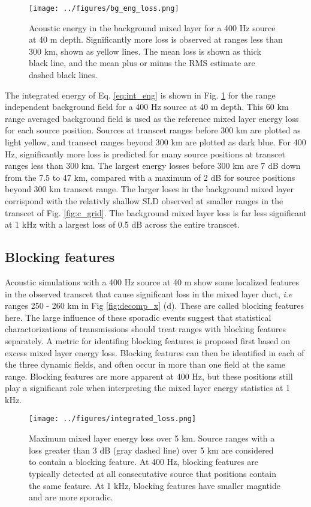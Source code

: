 \documentclass[preprint,NumberedRefs]{JASA}
\begin{document}
\begin{figure}
\texttt{[image: ../figures/bg\_eng\_loss.png]}
    \caption{Acoustic energy in the background mixed layer for a 400 Hz source at 40 m depth. Significantly more loss is observed at ranges less than 300 km, shown as yellow lines. The mean loss is shown as thick black line, and the mean plus or minus the RMS estimate are dashed black lines.}
    \label{fig:bg_eng}
\end{figure}
The integrated energy of Eq. \eqref{eq:int_eng} is shown in Fig. \ref{fig:bg_eng} for the range independent background field for a 400 Hz source at 40 m depth. This 60 km range averaged background field is used as the reference mixed layer energy loss for each source position. Sources at transcet ranges before 300 km are plotted as light yellow, and transect ranges beyond 300 km are plotted as dark blue. For 400 Hz, significantly more loss is predicted for many source positions at transcet ranges less than 300 km. The largest energy losses before 300 km are 7 dB down from the 7.5 to 47 km, compared with a maximum of 2 dB for source positions beyond 300 km transcet range. The larger loses in the background mixed layer corrispond with the relativly shallow SLD observed at smaller ranges in the transcet of Fig. \ref{fig:c_grid}. The background mixed layer loss is far less significant at 1 kHz with a largest loss of 0.5 dB across the entire transcet.

\subsection{Blocking features}
Acoustic simulations with a 400 Hz source at 40 m show some localized features in the observed transcet that cause significant loss in the mixed layer duct, \emph{i.e} ranges 250 - 260 km in Fig \ref{fig:decomp_x} (d). These are called blocking features here. The large influence of these sporadic events suggest that statistical charactorizations of transmissions should treat ranges with blocking features separately. A metric for identifing blocking features is proposed first based on excess mixed layer energy loss. Blocking features can then be identified in each of the three dynamic fields, and often occur in more than one field at the same range. Blocking features are more apparent at 400 Hz, but these positions still play a significant role when interpreting the mixed layer energy statistics at 1 kHz.

\begin{figure}
\texttt{[image: ../figures/integrated\_loss.png]}
    \caption{Maximum mixed layer energy loss over 5 km. Source ranges with a loss greater than 3 dB (gray dashed line) over 5 km are considered to contain a blocking feature. At 400 Hz, blocking features are typically detected at all consecutative source that positions contain the same feature. At 1 kHz, blocking features have smaller magntide and are more sporadic.}
    \label{fig:blocking}
\end{figure}
\end{document}
